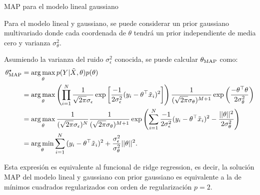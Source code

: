 \documentclass[9pt, handout]{beamer}
\begin{document}
\begin{frame}{MAP para el modelo lineal gaussiano}

Para el modelo lineal y gaussiano, se puede considerar un prior gaussiano multivariado donde cada coordenada de $\theta$ tendrá un prior independiente de media cero y varianza $\sigma_\theta^2$.\\ \pause

Asumiendo la varianza del ruido $\sigma_\epsilon^2$ conocida, se puede calcular $\theta_\text{MAP}$ como:
\begin{align}
	\theta_\text{MAP}^\star 	&= \operatorname*{arg\,max}_\theta p(Y|\tilde{X},\theta)p(\theta)\nonumber\\
	&= \operatorname*{arg\,max}_\theta \left(\prod_{i=1}^N \frac{1}{\sqrt{2\pi}\sigma_\epsilon} \exp\left[{\frac{-1}{2\sigma_\epsilon^2}(y_i-\theta^\top\tilde{x}_i)^2}\right]\right)									\frac{1}{(\sqrt{2\pi}\sigma_\theta)^{M+1}} \exp\left({\frac{-\theta^\top\theta}{2\sigma_\theta^2}}\right) \nonumber\\
	&= \operatorname*{arg\,max}_\theta  \frac{1}{(\sqrt{2\pi}\sigma_\epsilon)^N} \frac{1}{(\sqrt{2\pi}\sigma_\theta)^{M+1}} \exp\left( \sum_{i=1}^N{\frac{-1}{2\sigma_\epsilon^2}(y_i-\theta^\top\tilde{x}_i)^2} -{\frac{||\theta||^2}{2\sigma_\theta^2}}\right) \nonumber\\
	&= \operatorname*{arg\,min}_\theta \sum_{i=1}^N{(y_i-\theta^\top\tilde{x}_i)^2} +{\frac{\sigma_\epsilon^2}{\sigma_\theta^2}||\theta||^2}.\nonumber
\end{align}\pause

Esta expresión es equivalente al funcional de ridge regression, es decir, la solución MAP del modelo lineal y gaussiano con prior gaussiano es equivalente a la de mínimos cuadrados regularizados con orden de  regularización $p=2$.\\

\end{frame}
\end{document}
